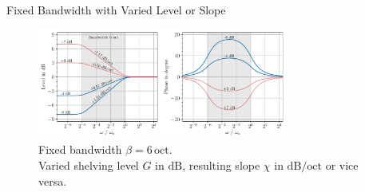 \documentclass[mathserif,aspectratio=169]{beamer}
\newcommand{\tw}{0.73}
\begin{document}
%
%
%
\begin{frame}{Fixed Bandwidth with Varied Level or Slope}
\begin{figure}
\captionsetup{width=.65\linewidth}
\includegraphics[width=\tw\textwidth]{../graphics/low-shelving-filter-varying-gain.pdf}
\caption{Fixed bandwidth $\beta=6\,\mathrm{oct}$.\\Varied shelving level $G$ in
$\mathrm{dB}$, resulting slope $\chi$ in $\mathrm{dB/oct}$ or vice versa.}
\label{fig:low-shelving-filter-varying-gain}
\end{figure}
\end{frame}
%
%
%
\end{document}
